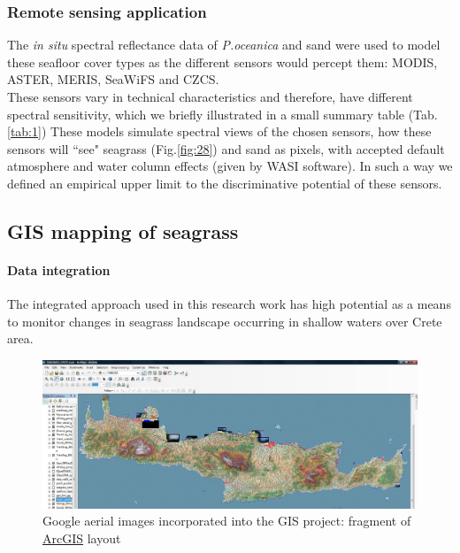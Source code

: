 \documentclass[11pt]{article}
\begin{document}
\subsubsection{Remote sensing application}
The \textit{in situ} spectral reflectance data of \textit{P.oceanica} and sand were used to model these seafloor cover
types as the different sensors would percept them: \ac{MODIS}, \ac{ASTER}, \ac{MERIS}, \ac{SeaWiFS} and \ac{CZCS}.\\
These sensors vary in technical characteristics and therefore, have different spectral sensitivity, 
which we briefly illustrated in a small summary table (Tab.\ref{tab:1})\label{page-intmap}
These models simulate spectral views of the chosen sensors, how these sensors will ``see" seagrass (Fig.\ref{fig:28}) and sand as
pixels, with accepted default atmosphere and water column effects (given by \ac{WASI} software). In such
a way we defined an empirical upper limit to the discriminative potential of these sensors. 

\subsection{GIS mapping of seagrass}

\paragraph{Data integration}
The integrated approach used in this research work has high potential as a means to monitor changes
in seagrass landscape occurring in shallow waters over Crete area.

\begin{figure}
	\begin{center}
		\includegraphics[scale=0.27]{Fig-37.jpg}
		\caption{Google aerial images incorporated into the GIS project: fragment of \href{http://www.esri.com/software/arcgis/index.html}{ArcGIS} layout}
		\label{fig:4.17}
	\end{center}
\end{figure}
\end{document}
